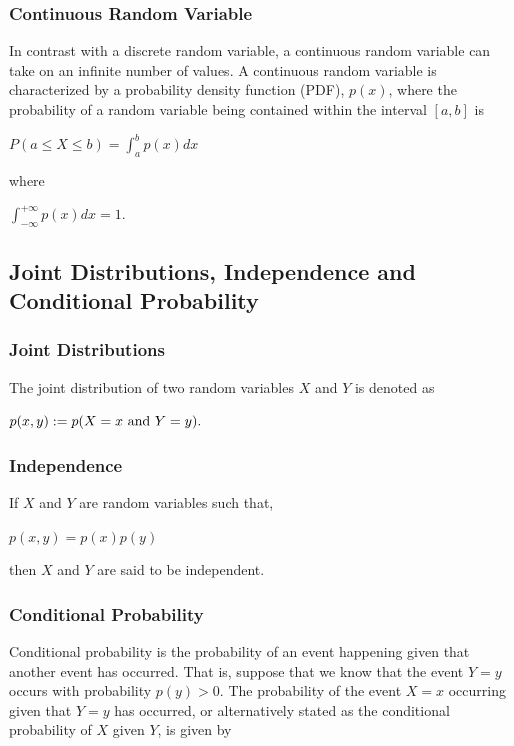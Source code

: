 \documentclass[twoside]{article}
\begin{document}
\subsubsection{Continuous Random Variable}

In contrast with a discrete random variable, a continuous random variable can take on an infinite number of values. A continuous random variable is characterized by a probability density function (PDF), $p(x)$, where the probability of a random variable being contained within the interval $[a,b]$ is
\begin{center}
$P(a \leq X \leq b) = \int_{a}^{b}p(x)dx$
\end{center}
where
\begin{center}
$\int_{-\infty}^{+\infty}p(x)dx=1$.
\end{center}

\subsection{Joint Distributions, Independence and Conditional Probability}

\subsubsection{Joint Distributions}

The joint distribution of two random variables $X$ and $Y$ is denoted as \begin{center}
$p(x,y):=p(X=x\ \textnormal{and}\ Y=y).$
\end{center}

\subsubsection{Independence}

If $X$ and $Y$ are random variables such that,
\begin{center}
$p(x,y)=p(x)p(y)$
\end{center}
then $X$ and $Y$ are said to be independent.

\subsubsection{Conditional Probability}

Conditional probability is the probability of an event happening given that another event has occurred. That is, suppose that we know that the event $Y = y$ occurs with probability $p(y) > 0$. The probability of the event $X=x$ occurring given that $Y=y$ has occurred, or alternatively stated as the conditional probability of $X$ given $Y$, is given by
\end{document}
